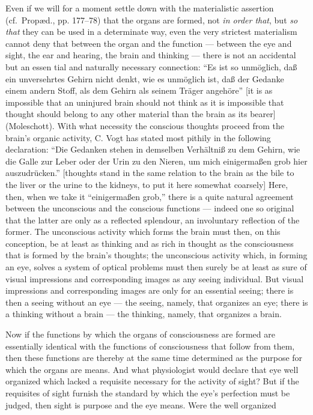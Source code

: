 \documentclass[12pt,a4paper]{book}
\begin{document}
Even if we will for a moment settle down with the materialistic assertion
(cf.\ Propæd., pp. 177--78) that the organs are formed, not \emph{in order that},
but \emph{so that} they can be used in a determinate way, even the very strictest
materialism cannot deny that between the organ and the function --- between the
eye and sight, the ear and hearing, the brain and thinking --- there is not an
accidental but an essen%
tial and naturally necessary connection: ``Es ist so unmöglich, daß ein
unversehrtes Gehirn nicht denkt, wie es unmöglich ist, daß der Gedanke einem
andern Stoff, als dem Gehirn als seinem Träger angehöre'' [it is as impossible
that an uninjured brain should not think as it is impossible that thought should
belong to any other material than the brain as its bearer] (Moleschott). With
what necessity the conscious thoughts proceed from the brain's organic activity,
C. Vogt has stated most pithily in the following declaration: ``Die Gedanken
stehen in demselben Verhältniß zu dem Gehirn, wie die Galle zur Leber oder der
Urin zu den Nieren, um mich einigermaßen grob hier auszudrücken.'' [thoughts
stand in the same relation to the brain as the bile to the liver or the urine to
the kidneys, to put it here somewhat coarsely] Here, then, when we take it
``einigermaßen grob,'' there is a quite natural agreement between the unconscious
and the conscious functions --- indeed one so original that the latter are only
as a reflected splendour, an involuntary reflection of the former. The
unconscious activity which forms the brain must then, on this conception, be at
least as thinking and as rich in thought as the consciousness that is formed by
the brain's thoughts; the unconscious activity which, in forming an eye, solves a
system of optical problems must then surely be at least as sure of visual
impressions and corresponding images as any seeing individual. But visual
impressions and corresponding images are only for an essential seeing; there is
then a seeing without an eye --- the seeing, namely, that organizes an eye; there
is a thinking without a brain --- the thinking, namely, that organizes a brain.

Now if the functions by which the organs of consciousness are formed are
essentially identical with the functions of consciousness that follow from them,
then these functions are thereby at the same time determined as the purpose for
which the organs are means. And what physiologist would declare that eye well
organized which lacked a requisite necessary for the activity of sight? But if
the requisites of sight furnish the standard by which the eye's perfection must
be judged, then sight is purpose and the eye means. Were the well organized
\end{document}
